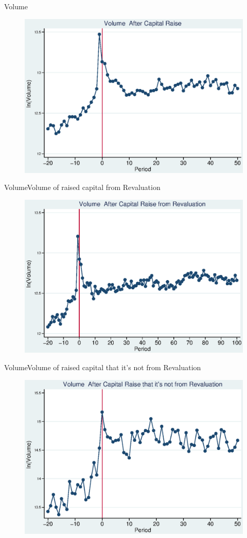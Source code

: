 \documentclass{beamer}
\begin{document}
\begin{frame}{Volume}
\begin{figure}
\centering
\includegraphics[width=0.7\linewidth]{Output/volume.eps}
\label{fig:volume}
\end{figure}
\end{frame}


\begin{frame}{Volume}{Volume of raised capital from Revaluation}
\begin{figure}
\centering
\includegraphics[width=0.7\linewidth]{Output/volume_Revaluation.eps}
\label{fig:volumerevaluation}
\end{figure}
\end{frame}


\begin{frame}{Volume}{Volume of raised capital that it's not from Revaluation}
\begin{figure}
\centering
\includegraphics[width=0.7\linewidth]{Output/volume_NoRevaluation.eps}
\label{fig:volumenorevaluation}
\end{figure}
\end{frame}
\end{document}
